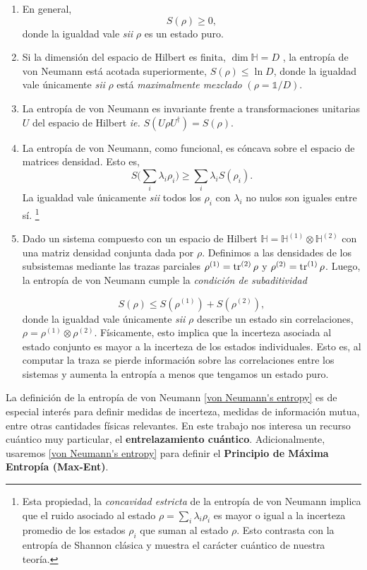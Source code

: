 \documentclass{report} %
\newcommand{\sii}{\textit{sii }}
\newcommand{\ie}{\textit{ie. }}
\numberwithin{equation}{section}
\begin{document}
 \begin{enumerate}
     \item En general,
     $$
     S(\rho) \geq 0,
     $$
     donde la igualdad vale \sii $\rho$ es un estado puro.
     \item 
     Si la dimensión del espacio de Hilbert es finita, $\dim \mathbb{H} = D$ , la entropía de von Neumann está acotada superiormente, $S(\rho) \leq \ln D$, donde la igualdad vale únicamente \sii $\rho$ está \textit{maximalmente mezclado} $(\rho = \mathds{1}/D)$.
     \item La entropía de von Neumann es invariante frente a  transformaciones unitarias $U$ del espacio de Hilbert \ie $S(U\rho U^{\dagger}) = S(\rho)$.
     \item La entropía de von Neumann, como funcional, es cóncava sobre el espacio de matrices densidad. Esto es,
     $$
     S \bigg(\sum_{i} \lambda_i \rho_i\bigg) \geq \sum_{i} \lambda_i S(\rho_i).
     $$
     La igualdad vale únicamente \sii todos los $\rho_i$ con $\lambda_i$ no nulos son iguales entre sí. \footnote{Esta propiedad, la \textit{concavidad estricta} de la entropía de von Neumann implica que el ruido asociado al estado $\rho = \sum_i \lambda_i \rho_i$ es mayor o igual a la incerteza promedio de los estados $\rho_i$ que suman al estado $\rho$. Esto contrasta con la entropía de Shannon clásica y muestra el carácter cuántico de nuestra teoría.}
     \item Dado un sistema compuesto con un espacio de Hilbert $\mathbb{H} = \mathbb{H}^{(1)} \otimes \mathbb{H}^{(2)}$ con una matriz densidad conjunta dada por $\rho$. Definimos a las densidades de los subsistemas mediante las trazas parciales $\rho^{(1)}=\tr^{(2)} \rho$ y $\rho^{(2)}=\tr^{(1)} \rho$. Luego, la entropía de von Neumann cumple la \textit{condición de subaditividad}
     
     $$
     S(\rho) \leq S(\rho^{(1)}) + S(\rho^{(2)}),
     $$
     donde la igualdad vale únicamente \sii $\rho$ describe un estado sin correlaciones, $\rho = \rho^{(1)} \otimes \rho^{(2)}$. Físicamente, esto implica que la incerteza asociada al estado conjunto es mayor a la incerteza de los estados individuales. Esto es, al computar la traza se pierde información sobre las correlaciones entre los sistemas y aumenta la entropía a menos que tengamos un estado puro. 
     \end{enumerate}
   
La definición de la entropía de von Neumann \eqref{von Neumann's entropy} es de especial interés para definir medidas de incerteza, medidas de información mutua, entre otras cantidades físicas relevantes. En este trabajo nos interesa un recurso cuántico muy particular, el \textbf{entrelazamiento cuántico}. Adicionalmente, usaremos \eqref{von Neumann's entropy} para definir el \textbf{Principio de Máxima Entropía (Max-Ent)}.
     
\end{document}
